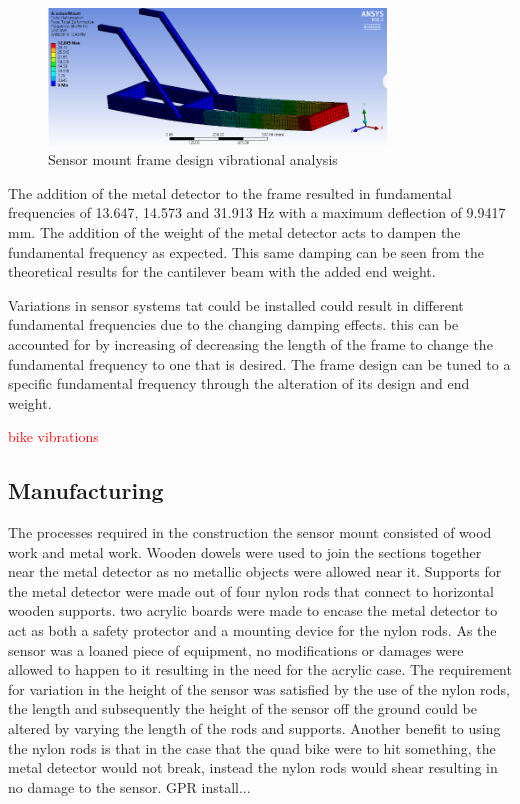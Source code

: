 \documentclass[main.tex]{subfiles}
\begin{document}
\begin{figure}[ht]
\includegraphics[width=0.8\textwidth]{frameANSYS.PNG}
\centering
\caption{Sensor mount frame design vibrational analysis} 
\end{figure} 

The addition of the metal detector to the frame resulted in fundamental frequencies of 13.647, 14.573 and 31.913 Hz with a maximum deflection of 9.9417 mm. The addition of the weight of the metal detector acts to dampen the fundamental frequency as expected. This same damping can be seen from the theoretical results for the cantilever beam with the added end weight.

Variations in sensor systems tat could be installed could result in different fundamental frequencies due to the changing damping effects. this can be accounted for by increasing of decreasing the length of the frame to change the fundamental frequency to one that is desired. The frame design can be tuned to a specific fundamental frequency through the alteration of its design and end weight. 

\textcolor{red}{bike vibrations}  

\subsection{Manufacturing}
The processes required in the construction the sensor mount consisted of wood work and metal work. Wooden dowels were used to join the sections together near the metal detector as no metallic objects were allowed near it. Supports for the metal detector were made out of four nylon rods that connect to horizontal wooden supports. two acrylic boards were made to encase the metal detector to act as both a safety protector and a mounting device for the nylon rods. As the sensor was a loaned piece of equipment, no modifications or damages were allowed to happen to it resulting in the need for the acrylic case. The requirement for variation in the height of the sensor was satisfied by the use of the nylon rods, the length and subsequently the height of the sensor off the ground could be altered by varying the length of the rods and supports. Another benefit to using the nylon rods is that in the case that the quad bike were to hit something, the metal detector would not break, instead the nylon rods would shear resulting in no damage to the sensor.
GPR install...
\end{document}
